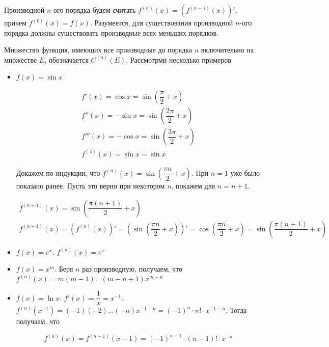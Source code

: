 \documentclass[a4paper]{article}
\theoremstyle{named}
\begin{document}
\begin{colloq}
		Производной $n$-ого порядка будем считать $f^{(n)}(x) = (f^{(n - 1)}(x))'$, причем $f^{(0)}(x) = f(x)$. Разумеется, для существования производной $n$-ого порядка должны существовать производные всех меньших порядков.

		Множество функция, имеющих все производные до порядка $n$ включительно на множестве $E$, обозначается $C^{(n)}(E)$. Рассмотрми несколько примеров

		\begin{itemize}
			\item
			$f(x) = \sin x$

			\[\begin{gathered}
				f'(x) = \cos x = \sin \left(\dfrac{\pi}{2} + x\right) \\
				f''(x) = - \sin x = \sin \left(\dfrac{2 \pi}{2} + x\right) \\
				f'''(x) = - \cos x = \sin \left(\dfrac{3 \pi}{2} + x\right) \\
				f^{(4)}(x) = \sin x = \sin x
			\end{gathered}\]

			Докажем по индукции, что $f^{(n)}(x) = \sin \left(\dfrac{\pi n}{2} + x\right)$. При $n = 1$ уже было показано ранее. Пусть это верно при некотором $n$, покажем для $n = n + 1$.

			\[\begin{gathered}
				f^{(n + 1)}(x) = \sin \left(\dfrac{\pi(n + 1)}{2} + x\right) \\
				f^{(n + 1)}(x) = (f^{(n)}(x))' = \left(\sin \left(\dfrac{\pi n}{2} + x\right)\right)' = 
				\cos \left(\dfrac{\pi n}{2} + x\right) = \sin \left(\dfrac{\pi(n + 1)}{2} + x\right)
			\end{gathered}\]

			\item
			$f(x) = e^x$. $f^{(n)}(x) = e^x$

			\item
			$f(x) = x^m$. Беря $n$ раз производную, получаем, что $f^{(n)}(x) = m(m - 1) \dots (m - n + 1)x^{m - n}$

			\item
			$f(x) = \ln x$. $f'(x) = \dfrac{1}{x} = x^{-1}$. $f^{(n)}(x^{-1}) = (-1)(-2)\dots(-n)x^{-1-n} = (-1)^n \cdot n! \cdot x^{-1 - n}$, Тогда получаем, что

			\begin{equation*}
				f^{(n)}(x) = f^{(n - 1)}(x - 1) = (-1)^{n - 1} \cdot (n - 1)! \cdot x^{-n}
			\end{equation*}
		\end{itemize}


\end{colloq}
\end{document}
